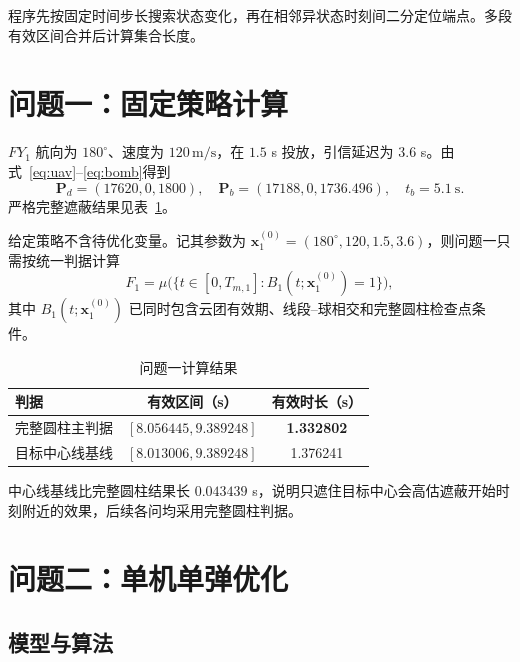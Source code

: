 \documentclass[12pt,a4paper]{article}
\begin{document}
程序先按固定时间步长搜索状态变化，再在相邻异状态时刻间二分定位端点。多段有效区间合并后计算集合长度。

\section{问题一：固定策略计算}

$FY_1$ 航向为 $180^\circ$、速度为 $120\,\mathrm{m/s}$，在 $1.5$ s 投放，引信延迟为 $3.6$ s。由式~\eqref{eq:uav}--\eqref{eq:bomb}得到
\begin{equation}
\boldsymbol P_d=(17620,0,1800),\quad
\boldsymbol P_b=(17188,0,1736.496),\quad t_b=5.1\ \mathrm{s}.
\end{equation}
严格完整遮蔽结果见表~\ref{tab:q1-result}。

给定策略不含待优化变量。记其参数为 $\boldsymbol x_1^{(0)}=(180^\circ,120,1.5,3.6)$，则问题一只需按统一判据计算
\begin{equation}
F_1=\mu\bigl(\{t\in[0,T_{m,1}]:B_1(t;\boldsymbol x_1^{(0)})=1\}\bigr),
\label{eq:q1-objective}
\end{equation}
其中 $B_1(t;\boldsymbol x_1^{(0)})$ 已同时包含云团有效期、线段--球相交和完整圆柱检查点条件。

\begin{table}[H]
\centering
\caption{问题一计算结果}
\label{tab:q1-result}
\begin{tabular}{lcc}
\toprule
判据 & 有效区间（s） & 有效时长（s） \\
\midrule
完整圆柱主判据 & $[8.056445,9.389248]$ & \textbf{1.332802} \\
目标中心线基线 & $[8.013006,9.389248]$ & 1.376241 \\
\bottomrule
\end{tabular}
\end{table}

中心线基线比完整圆柱结果长 $0.043439$ s，说明只遮住目标中心会高估遮蔽开始时刻附近的效果，后续各问均采用完整圆柱判据。

\section{问题二：单机单弹优化}

\subsection{模型与算法}
\end{document}
